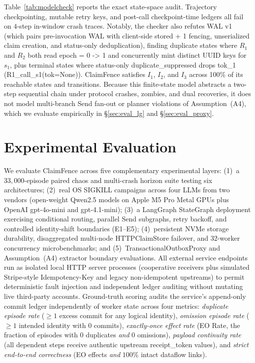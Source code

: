 \documentclass[10pt,journal]{IEEEtran}
\def\CF{ClaimFence}%
\def\texttt#1{#1}%
\theoremstyle{definition}
\theoremstyle{remark}
\newcommand{\CF}{\textsc{ClaimFence}}
\begin{document}
Table~\ref{tab:modelcheck} reports the exact state-space audit. Trajectory checkpointing, mutable retry keys, and post-call checkpoint-time ledgers all fail on $4$-step in-window crash traces. Notably, the checker also refutes \texttt{WAL v1} (which pairs pre-invocation WAL with client-side \texttt{stored + 1} fencing, unserialized claim creation, and status-only deduplication), finding \MCVOneDup{} duplicate states where $R_1$ and $R_2$ both read \texttt{epoch = 0 -> 1} and concurrently mint distinct UUID keys for $s_1$, plus \MCVOnePay{} terminal states where status-only \texttt{duplicate\_suppressed} drops \texttt{tok\_1} (\texttt{R1\_call\_s1(tok=None)}). \CF{} satisfies $I_1$, $I_2$, and $I_3$ across 100\% of its \MCCFStates{} reachable states and \MCCFEdges{} transitions. Because this finite-state model abstracts a two-step sequential chain under protocol crashes, zombies, and dual recoveries, it does not model multi-branch \texttt{Send} fan-out or planner violations of Assumption~(A4), which we evaluate empirically in \S\ref{sec:eval_lg} and \S\ref{sec:eval_proxy}.

\section{Experimental Evaluation}\label{sec:eval}

We evaluate \CF{} across five complementary experimental layers: (1)~a $33{,}000$-episode paired chaos and multi-crash horizon suite testing six architectures; (2)~real OS \texttt{SIGKILL} campaigns across four LLMs from two vendors (open-weight \texttt{Qwen2.5} models on Apple M5 Pro Metal GPUs plus \texttt{OpenAI} \texttt{gpt-4o-mini} and \texttt{gpt-4.1-mini}); (3)~a \texttt{LangGraph} \texttt{StateGraph} deployment exercising conditional routing, parallel \texttt{Send} subgraphs, retry backoff, and controlled identity-shift boundaries (E1--E5); (4)~persistent NVMe storage durability, disaggregated multi-node \texttt{HTTPClaimStore} failover, and 32-worker concurrency microbenchmarks; and (5)~\texttt{TransactionalOutboxProxy} and Assumption~(A4) extractor boundary evaluations. All external service endpoints run as isolated local HTTP server processes (cooperative receivers plus simulated Stripe-style \texttt{Idempotency-Key} and legacy non-idempotent upstreams) to permit deterministic fault injection and independent ledger auditing without mutating live third-party accounts. Ground-truth scoring audits the service's append-only commit ledger independently of worker state across four metrics: \emph{duplicate episode rate} ($\ge 1$ excess commit for any logical identity), \emph{omission episode rate} ($\ge 1$ intended identity with $0$ commits), \emph{exactly-once effect rate} (\texttt{EO Rate}, the fraction of episodes with $0$ duplicates \emph{and} $0$ omissions), \emph{payload continuity rate} (all dependent steps receive authentic upstream \texttt{receipt\_token} values), and \emph{strict end-to-end correctness} (\texttt{EO} effects \emph{and} $100\%$ intact dataflow links).
\end{document}
